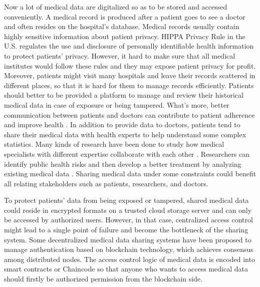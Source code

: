 \documentclass[conference]{IEEEtran}
\begin{document}
Now a lot of medical data are digitalized so as to be stored and accessed conveniently. A medical record is produced after a patient goes to see a doctor and often resides on the hospital's database. Medical records usually contain highly sensitive information about patient privacy. HIPPA Privacy Rule  \cite{centers2004hipaa} in the U.S. regulates the use and disclosure of personally identifiable health information to protect patients' privacy. However, it hard to make sure that all medical institutes would follow these rules and they may expose patient privacy for profit. Moreover, patients might visit many hospitals and leave their records scattered \cite{zhang2016secure} in different places, so that it is hard for them to manage records efficiently. Patients should better to be provided a platform to manage and review their historical medical data in case of exposure or being tampered. What's more, better communication between patients and doctors can contribute to patient adherence \cite{zolnierek2009physician} and improve health \cite{street2009does}. In addition to provide data to doctors, patients tend to share their medical data with health experts to help understand some complex statistics. Many kinds of research have been done to study how medical specialists with different expertise collaborate with each other \cite{fitzpatrick2013review}.  Researchers can identify public health risks and then develop a better treatment by analyzing existing medical data \cite{office2015report}. 
Sharing medical data under some constraints could benefit all relating stakeholders such as patients, researchers, and doctors. 

To protect patients' data from being exposed or tampered, shared medical data could reside in encrypted formats on a trusted cloud storage server and can only be accessed by authorized users. However, in that case, centralized access control might lead to a single point of failure and become the bottleneck of the sharing system. Some decentralized medical data sharing systems \cite{azaria2016medrec,fan2018medblock,xia2017bbds} have been proposed to manage authentication based on blockchain\cite{nakamoto2008bitcoin} technology, which achieves consensus among distributed nodes. The access control logic of medical data is encoded into smart contracts\cite{azaria2016medrec} or Chaincode \cite{dubovitskaya2017secure} so that anyone who wants to access medical data should firstly be authorized permission from the blockchain side.
\end{document}
